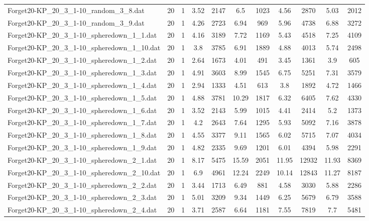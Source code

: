 \begin{table}[!ht]
\begin{tabular}{lcccccccccc}
Forget20-KP\_20\_3\_1-10\_random\_3\_8.dat & 20 & 1 & 3.52 & 2147 & 6.5 & 1023 & 4.56 & 2870 & 5.03 & 2012 \\
Forget20-KP\_20\_3\_1-10\_random\_3\_9.dat & 20 & 1 & 4.26 & 2723 & 6.94 & 969 & 5.96 & 4738 & 6.88 & 3272 \\
Forget20-KP\_20\_3\_1-10\_spheredown\_1\_1.dat & 20 & 1 & 4.16 & 3189 & 7.72 & 1169 & 5.43 & 4518 & 7.25 & 4109 \\
Forget20-KP\_20\_3\_1-10\_spheredown\_1\_10.dat & 20 & 1 & 3.8 & 3785 & 6.91 & 1889 & 4.88 & 4013 & 5.74 & 2498 \\
Forget20-KP\_20\_3\_1-10\_spheredown\_1\_2.dat & 20 & 1 & 2.64 & 1673 & 4.01 & 491 & 3.45 & 1361 & 3.9 & 605 \\
Forget20-KP\_20\_3\_1-10\_spheredown\_1\_3.dat & 20 & 1 & 4.91 & 3603 & 8.99 & 1545 & 6.75 & 5251 & 7.31 & 3579 \\
Forget20-KP\_20\_3\_1-10\_spheredown\_1\_4.dat & 20 & 1 & 2.94 & 1333 & 4.51 & 613 & 3.8 & 1892 & 4.72 & 1466 \\
Forget20-KP\_20\_3\_1-10\_spheredown\_1\_5.dat & 20 & 1 & 4.88 & 3781 & 10.29 & 1817 & 6.32 & 6405 & 7.62 & 4330 \\
Forget20-KP\_20\_3\_1-10\_spheredown\_1\_6.dat & 20 & 1 & 3.52 & 2143 & 5.99 & 1015 & 4.41 & 2414 & 5.2 & 1373 \\
Forget20-KP\_20\_3\_1-10\_spheredown\_1\_7.dat & 20 & 1 & 4.2 & 2643 & 7.64 & 1295 & 5.93 & 5092 & 7.16 & 3878 \\
Forget20-KP\_20\_3\_1-10\_spheredown\_1\_8.dat & 20 & 1 & 4.55 & 3377 & 9.11 & 1565 & 6.02 & 5715 & 7.07 & 4034 \\
Forget20-KP\_20\_3\_1-10\_spheredown\_1\_9.dat & 20 & 1 & 4.82 & 2335 & 9.69 & 1201 & 6.01 & 4394 & 5.98 & 2291 \\
Forget20-KP\_20\_3\_1-10\_spheredown\_2\_1.dat & 20 & 1 & 8.17 & 5475 & 15.59 & 2051 & 11.95 & 12932 & 11.93 & 8369 \\
Forget20-KP\_20\_3\_1-10\_spheredown\_2\_10.dat & 20 & 1 & 6.9 & 4961 & 12.24 & 2249 & 10.14 & 12843 & 11.27 & 8187 \\
Forget20-KP\_20\_3\_1-10\_spheredown\_2\_2.dat & 20 & 1 & 3.44 & 1713 & 6.49 & 881 & 4.58 & 3030 & 5.88 & 2286 \\
Forget20-KP\_20\_3\_1-10\_spheredown\_2\_3.dat & 20 & 1 & 5.01 & 3209 & 9.34 & 1449 & 6.25 & 5679 & 6.79 & 3588 \\
Forget20-KP\_20\_3\_1-10\_spheredown\_2\_4.dat & 20 & 1 & 3.71 & 2587 & 6.64 & 1181 & 7.55 & 7819 & 7.7 & 5481 \\

\end{tabular}
\end{table}
